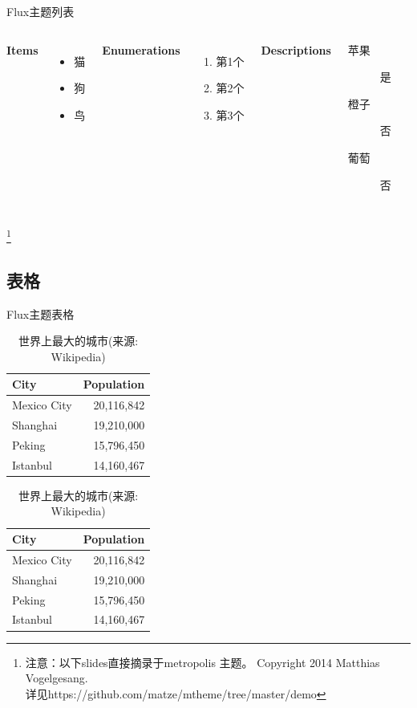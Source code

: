 \documentclass[t, aspectratio=169]{ctexbeamer}
\begin{document}
\begin{frame}{Flux主题}{列表}
  \begin{columns}[T,onlytextwidth]
     \textbf{Items}
    \begin{itemize}
    \item 猫
    \item 狗
    \item 鸟
    \end{itemize}

     \textbf{Enumerations}
    \begin{enumerate}
    \item 第1个
    \item 第2个
    \item 第3个
    \end{enumerate}

     \textbf{Descriptions}
    \begin{description}
    \item[苹果] 是
    \item[橙子] 否
    \item[葡萄] 否
    \end{description}
  \end{columns}
  \let\thefootnote\relax\footnote{注意：以下slides直接摘录于metropolis
    主题。 Copyright 2014 Matthias Vogelgesang.\\
    详见https://github.com/matze/mtheme/tree/master/demo}
\end{frame}

\subsection{表格}

\begin{frame}{Flux主题}{表格}
  \begin{table}
    \caption{世界上最大的城市(来源: Wikipedia)}
    \begin{tabular}{@{} lr @{}}
      \toprule
      City & Population\\
      \midrule
      Mexico City & 20,116,842\\
      Shanghai & 19,210,000\\
      Peking & 15,796,450\\
      Istanbul & 14,160,467\\
      \bottomrule
    \end{tabular}
    \hspace*{1cm}
        \setlength\extrarowheight{3pt}
    \begin{tabular}{|lr|}
      \hline
      \rowcolor{primaryLight}\color{background}City & \color{background}Population\\
      \hline
      Mexico City & 20,116,842\\
      Shanghai & 19,210,000\\
      Peking & 15,796,450\\
      Istanbul & 14,160,467\\
      \hline
    \end{tabular}
\end{table}
\end{frame}
\end{document}
